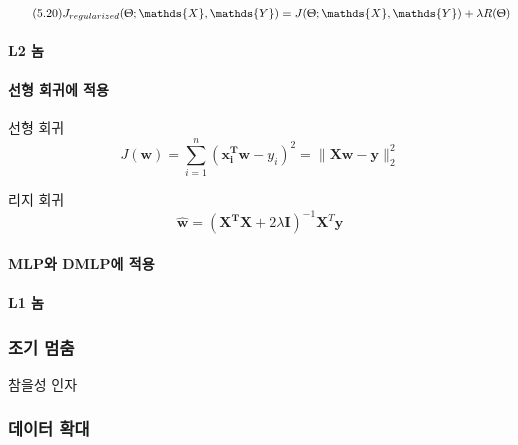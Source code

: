 \documentclass [12pt] {oblivoir}
\let\oldsubsubsection=\subsubsection
\renewcommand{\subsubsection}
{
  \filbreak
  \oldsubsubsection
}
\begin{document}
\begin{equation} \tag{5.20}
  J_{regularized}(\Uptheta; \mathds{X}, \mathds{Y}) = J(\Uptheta; \mathds{X}, \mathds{Y}) + \lambda R(\Uptheta)
\end{equation}

\paragraph*{L2 놈}\mbox{}

\vspace{3mm}

\paragraph*{선형 회귀에 적용}\mbox{}

선형 회귀
\begin{equation} \tag{5.26}
  J(\mathbf{w}) = \sum_{i=1}^{n}(\mathbf{x_{i}^{T}w} - y_{i})^{2} = \lVert \mathbf{Xw - y} \rVert_{2}^{2}
\end{equation}

리지 회귀
\begin{equation} \tag{5.29}
  \mathbf{\hat{w}} = (\mathbf{X^{T}X} + 2\lambda \mathbf{I})^{-1}\mathbf{X}^{T}\mathbf{y}
\end{equation}

\vspace{3mm}

\paragraph*{MLP와 DMLP에 적용}\mbox{}

\vspace{3mm}

\paragraph*{L1 놈}\mbox{}

\vspace{3mm}

\subsubsection{조기 멈춤}

참을성 인자

\subsubsection{데이터 확대}
\end{document}
